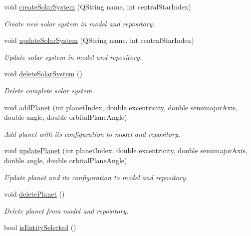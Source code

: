 \begin{DoxyCompactItemize}
\item 
void \hyperlink{classSolarSystemModel_a2cef5b7b9cfd7880f2206c28fcae3b2b}{create\-Solar\-System} (\-Q\-String name, int central\-Star\-Index)
\begin{DoxyCompactList}\small\item\em \-Create new solar system in model and repository. \end{DoxyCompactList}\item 
void \hyperlink{classSolarSystemModel_a4346c62aa3069d683c4d7b5c9c84a199}{update\-Solar\-System} (\-Q\-String name, int central\-Star\-Index)
\begin{DoxyCompactList}\small\item\em \-Update solar system in model and repository. \end{DoxyCompactList}\item 
void \hyperlink{classSolarSystemModel_ac4f8e24ab92b93a1808af5a68c86e00f}{delete\-Solar\-System} ()
\begin{DoxyCompactList}\small\item\em \-Delete complete solar system. \end{DoxyCompactList}\item 
void \hyperlink{classSolarSystemModel_a39f15260f4624aed3cde0fa4c4f20f5d}{add\-Planet} (int planet\-Index, double excentricity, double semimajor\-Axis, double angle, double orbital\-Plane\-Angle)
\begin{DoxyCompactList}\small\item\em \-Add planet with its configuration to model and repository. \end{DoxyCompactList}\item 
void \hyperlink{classSolarSystemModel_a7a1021e9dc6b7f5e6dd256689f754f5b}{update\-Planet} (int planet\-Index, double excentricity, double semimajor\-Axis, double angle, double orbital\-Plane\-Angle)
\begin{DoxyCompactList}\small\item\em \-Update planet and its configuration to model and repository. \end{DoxyCompactList}\item 
void \hyperlink{classSolarSystemModel_ac148261799e9bfe0cba02d37a75994ca}{delete\-Planet} ()
\begin{DoxyCompactList}\small\item\em \-Delete planet from model and repository. \end{DoxyCompactList}\item 
bool \hyperlink{classSolarSystemModel_a8c741144d8dd3192cc08658904c391bc}{is\-Entity\-Selected} ()

\end{DoxyCompactItemize}
